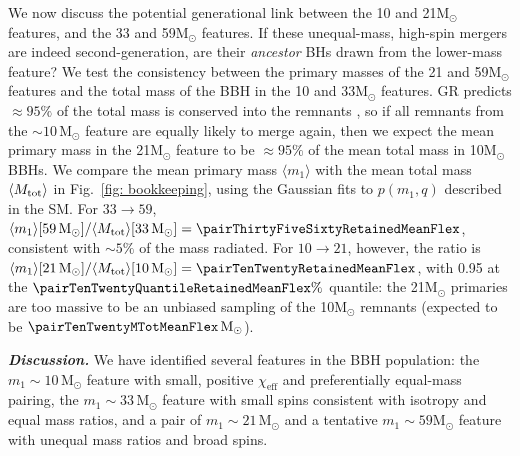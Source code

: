 \documentclass[%
    aps,
    prl,
    reprint,
    superscriptaddress,
    nolongbibliography,
    nobibnotes,
    nofootinbib,
    linenumbers,
    amsmath,amssymb,
]{revtex4-2}
\newcommand{\Msun}{\ensuremath{\mathrm{M}_{\odot}}}
\newcommand{\chieff}{\ensuremath{\chi_{\mathrm{eff}}}}
\newcommand{\featTen}{10\xspace}
\newcommand{\featTwenty}{21\xspace}
\newcommand{\featThirtyFive}{33\xspace}
\newcommand{\featSixty}{59\xspace}
\newcommand{\heading}[1]{\textbf{\textit{#1}}}
\begin{document}
We now discuss the potential generational link between the \featTen and \featTwenty $\Msun$ features, and the \featThirtyFive and \featSixty $\Msun$ features. If these unequal-mass, high-spin mergers are indeed second-generation, are their \textit{ancestor} \acp{BH} drawn from the lower-mass feature? We test the consistency between the primary masses of the \featTwenty and \featSixty $\Msun$ features and the total mass of the \ac{BBH} in the \featTen and \featThirtyFive $\Msun$ features. \ac{GR} predicts $\approx 95\%$ of the total mass is conserved into the remnants \cite[e.g.,][]{}, so if all remnants from the $\sim \featTen\,\Msun$ feature are equally likely to merge again, then we expect the mean primary mass in the \featTwenty $\Msun$ feature to be $\approx 95\%$ of the mean total mass in \featTen $\Msun$ \acp{BBH}. We compare the mean primary mass $\langle m_1\rangle$ with the mean total mass $\langle M_{\rm tot} \rangle$ in Fig.~\ref{fig: bookkeeping}, using the Gaussian fits to $p(m_1, q)$ described in the SM. For $\featThirtyFive \to \featSixty$, $\langle m_1 \rangle[{ \featSixty\,\Msun}] / \langle M_{\rm tot} \rangle[{\featThirtyFive\,\Msun}] = \pairThirtyFiveSixtyRetainedMeanFlex$, consistent with $\sim 5\%$ of the mass radiated. For $\featTen \to \featTwenty$, however, the ratio is $\langle m_1 \rangle[{ \featTwenty\,\Msun}] / \langle M_{\rm tot} \rangle[{\featTen\,\Msun}]=\pairTenTwentyRetainedMeanFlex$, with 0.95 at the $\pairTenTwentyQuantileRetainedMeanFlex\%$ quantile: the \featTwenty $\Msun$ primaries are too massive to be an unbiased sampling of the \featTen $\Msun$ remnants (expected to be $\pairTenTwentyMTotMeanFlex\,\Msun$).



\heading{Discussion.}
We have identified several features in the \ac{BBH} population: the $m_1\sim \featTen\,\Msun$ feature with small, positive $\chieff$ and preferentially equal-mass pairing, the $m_1\sim \featThirtyFive\,\Msun$ feature with small spins consistent with isotropy and equal mass ratios, and a pair of $m_1\sim\featTwenty\,\Msun$ and a tentative $m_1\sim \featSixty \Msun$ feature with unequal mass ratios and broad spins. 

\end{document}
